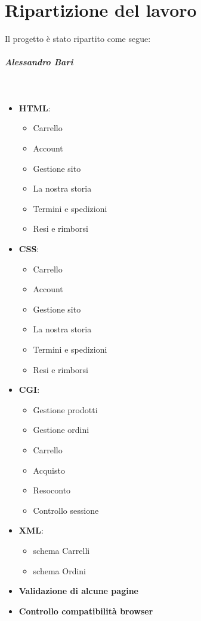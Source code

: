 \section{Ripartizione del lavoro}
Il progetto è stato ripartito come segue:
	\subparagraph{Alessandro Bari}~
	
	\begin{itemize}
		\item \textbf{HTML}:
			\begin{itemize}
				\item Carrello
				\item Account
				\item Gestione sito
				\item La nostra storia
				\item Termini e spedizioni
				\item Resi e rimborsi
			\end{itemize}
		
		\item \textbf{CSS}:
			\begin{itemize}
				\item Carrello
				\item Account
				\item Gestione sito
				\item La nostra storia
				\item Termini e spedizioni
				\item Resi e rimborsi
			\end{itemize}
		\item \textbf{CGI}:
			\begin{itemize}
				\item Gestione prodotti
				\item Gestione ordini
				\item Carrello
				\item Acquisto
				\item Resoconto
				\item Controllo sessione
			\end{itemize}
		
		\item \textbf{XML}:
			\begin{itemize}
			 	\item schema Carrelli
			 	\item schema Ordini
			\end{itemize}
		\item \textbf{Validazione di alcune pagine}
		\item \textbf{Controllo compatibilità browser}
	\end{itemize}
	
